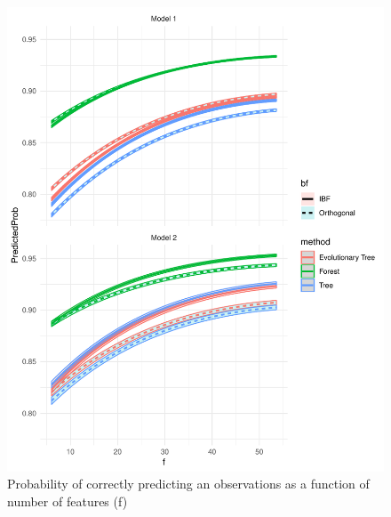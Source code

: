 \documentclass[]{elsarticle} %
\makeatletter
\def\maxwidth{\ifdim\Gin@nat@width>\linewidth\linewidth
\else\Gin@nat@width\fi}
\let\Oldincludegraphics\includegraphics
\renewcommand{\includegraphics}[1]{\Oldincludegraphics[width=\maxwidth]{#1}}
\makeatother
\begin{document}
\begin{figure}
\centering
\includegraphics{Trees_with_Base_Functions_v3_files/figure-latex/fig13-estimated-accuracy-f-1.pdf}
\caption{\label{fig:fig13-estimated-accuracy-f}Probability of correctly
predicting an observations as a function of number of features (f)}
\end{figure}
\end{document}
